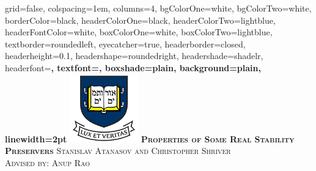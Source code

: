 \documentclass[landscape,final,a0paper,fontscale=0.26]{baposter}
\begin{document}
\begin{poster}%
  {
  grid=false,
  colspacing=1em,
  columns=4,
  bgColorOne=white,
  bgColorTwo=white,
  borderColor=black,
  headerColorOne=black,
  headerColorTwo=lightblue,
  headerFontColor=white,
  boxColorOne=white,
  boxColorTwo=lightblue,
  textborder=roundedleft,
  eyecatcher=true,
  headerborder=closed,
  headerheight=0.1\textheight,
  headershape=roundedright,
  headershade=shadelr,
  headerfont=\Large\bf\textsc, %
  textfont={\setlength{\parindent}{1.5em}},
  boxshade=plain,
  background=plain,
  linewidth=2pt
  }
    {\includegraphics[height=8em]{images/Yale}} 
  {\bf\textsc{Properties of Some Real Stability Preservers}\vspace{0.5em}}
  {\textsc{ Stanislav Atanasov and Christopher Shriver\\ Advised by: Anup Rao}}
  {%

\setlength{\fboxsep}{0pt}%
\setlength{\fboxrule}{3pt}%
  }

    \newcommand{\colouredcircle}{%
      \tikz{\useasboundingbox (-0.2em,-0.32em) rectangle(0.2em,0.32em); \draw[draw=black,fill=lightblue,line width=0.03em] (0,0) circle(0.18em);}}


\end{poster}
\end{document}
